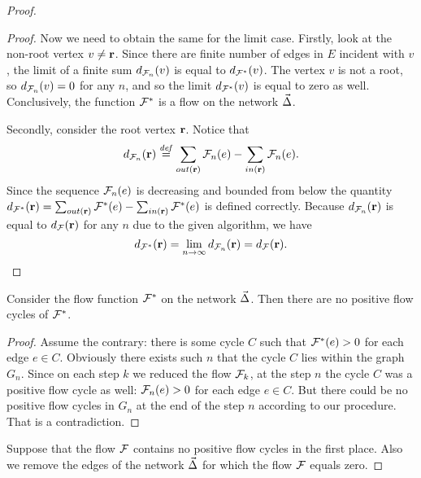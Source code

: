 \documentclass[12pt]{amsart}
\begin{document}
\begin{proof}
\begin{proof}
        Now we need to obtain the same for the limit case.
        Firstly, look at the non-root vertex $v \neq \mathbf{r}$.
        Since there are finite number of edges in $E$ incident with $v$, the limit of
          a finite sum $d_{\mathcal{F}_{n}}(v)$ is equal to $d_{\mathcal{F^{*}}}(v)$.
        The vertex $v$ is not a root, so $d_{\mathcal{F}_{n}}(v) = 0$ for any $n$, and so the limit $d_{\mathcal{F^{*}}}(v)$ is equal to zero as well.
        Conclusively, the function $\mathcal{F^{*}}$ is a flow on the network $\vec{\Delta}$.

        Secondly, consider the root vertex $\mathbf{r}$.
        Notice that
        \[
          d_{\mathcal{F}_{n}}(\mathbf{r}) \overset{\mathit{def}}{=} \sum_{out(\mathbf{r})} \mathcal{F}_{n}(e) - \sum_{in(\mathbf{r})} \mathcal{F}_{n}(e).
        \]
        Since the sequence $\mathcal{F}_{n}(e)$ is decreasing and bounded from below the quantity
          $d_{\mathcal{F^{*}}}(\mathbf{r})=\sum_{out(\mathbf{r})} \mathcal{F^{*}}(e) - \sum_{in(\mathbf{r})} \mathcal{F^{*}}(e)$ is defined correctly.
        Because $d_{\mathcal{F}_{n}}(\mathbf{r})$ is equal to $d_{\mathcal{F}}(\mathbf{r})$ for any $n$ due to the given algorithm, we have
        \[
          d_{\mathcal{F^{*}}}(\mathbf{r}) = \lim_{n \to \infty} d_{\mathcal{F}_{n}}(\mathbf{r}) = d_{\mathcal{F}}(\mathbf{r}).
        \]
      \end{proof}
      \begin{prop}
        Consider the flow function $\mathcal{F^{*}}$ on the network $\vec{\Delta}$.
        Then there are no positive flow cycles of $\mathcal{F^{*}}$.
      \end{prop}
      \begin{proof}
        Assume the contrary: there is some cycle $C$ such that $\mathcal{F^{*}}(e) > 0$ for
          each edge $e \in C$.
        Obviously there exists such $n$ that the cycle $C$ lies within the graph $G_n$.
        Since on each step $k$ we reduced the flow $\mathcal{F}_{k}$, at the step $n$
          the cycle $C$ was a positive flow cycle as well: $\mathcal{F}_{n}(e) > 0$ for each edge $e \in C$.
        But there could be no positive flow cycles in $G_n$ at the end of the step $n$ according to our procedure.
        That is a contradiction.
      \end{proof}

      Suppose that the flow $\mathcal{F}$ contains no positive flow cycles in the first place.
      Also we remove the edges of the network $\vec{\Delta}$ for which the flow $\mathcal{F}$ equals zero.


\end{proof}
\end{document}
